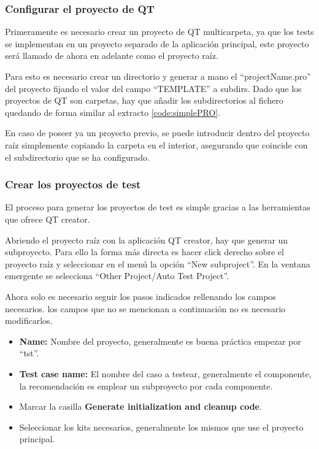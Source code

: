 \subsubsection{Configurar el proyecto de QT}

Primeramente es necesario crear un proyecto de QT multicarpeta, ya que los tests se implementan en un proyecto separado de la aplicación principal, este proyecto será llamado de ahora en adelante como el proyecto raíz.

Para esto es necesario crear un directorio y generar a mano el ``projectName.pro'' del proyecto fijando el valor del campo ``TEMPLATE'' a subdirs. Dado que los proyectos de QT son carpetas, hay que añadir los subdirectorios al fichero quedando de forma similar al extracto \ref{code:simplePRO}.


En caso de poseer ya un proyecto previo, se puede introducir dentro del proyecto raíz simplemente copiando la carpeta en el interior, asegurando que coincide con el subdirectorio que se ha configurado.

\subsubsection{Crear los proyectos de test}

El proceso para generar los proyectos de test es simple gracias a las herramientas que ofrece QT creator.

Abriendo el proyecto raíz con la aplicación QT creator, hay que generar un subproyecto. Para ello la forma más directa es hacer click derecho sobre el proyecto raíz y seleccionar en el menú la opción ``New subproject''. En la ventana emergente se selecciona ``Other Project/Auto Test Project''.

Ahora solo es necesario seguir los pasos indicados rellenando los campos necesarios. los campos que no se mencionan a continuación no es necesario modificarlos.

\begin{itemize}
    \item \textbf{Name:} Nombre del proyecto, generalmente es buena práctica empezar por ``tst''.
    \item \textbf{Test case name:} El nombre del caso a testear, generalmente el componente, la recomendación es emplear un subproyecto por cada componente.
    \item Marcar la casilla \textbf{Generate initialization and cleanup code}.
    \item Seleccionar los kits necesarios, generalmente los mismos que use el proyecto principal.
\end{itemize}

